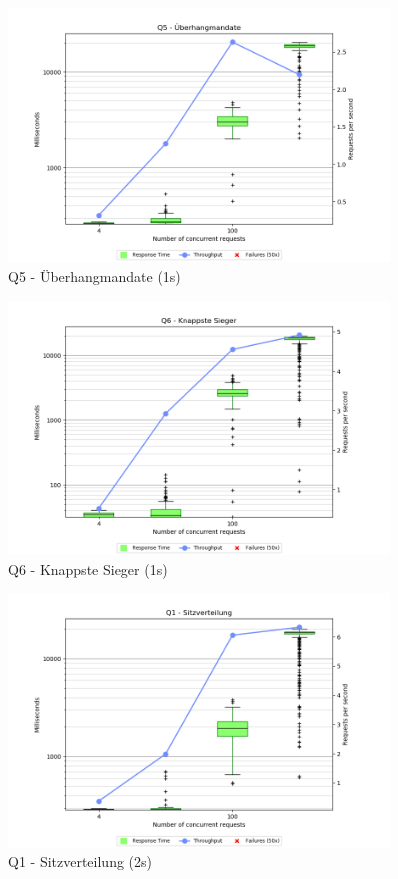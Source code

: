 \documentclass[a4paper]{scrreprt}
\begin{document}
\begin{figure}[h]
\centering
\includegraphics[width=0.9\textwidth]{images/plots_1s/Q5}
\caption {Q5 - Überhangmandate (1s)}
\end{figure}

\begin{figure}[h]
\centering
\includegraphics[width=0.9\textwidth]{images/plots_1s/Q6}
\caption {Q6 - Knappste Sieger (1s)}
\end{figure}

\begin{figure}[h]
\centering
\includegraphics[width=0.9\textwidth]{images/plots_2s/Q1}
\caption {Q1 - Sitzverteilung (2s)}
\end{figure}
\end{document}
